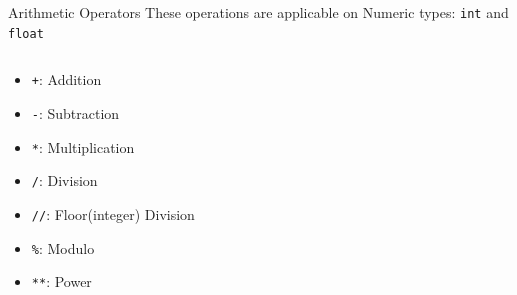         \begin{frame}{Arithmetic Operators}
            \LARGE
            These operations are applicable on Numeric types: \texttt{int} and \texttt{float}
            \pause
            \begin{columns}
               \begin{column}{0.35\textwidth}
                \vspace{-5mm}
                \begin{itemize}
                    \item \texttt{+}: Addition
                    \pause
                    \item \texttt{-}: Subtraction
                    \pause
                    \item \texttt{*}: Multiplication
                    \pause
                    \item \texttt{/}: Division
                    \pause
                    \item \texttt{//}: Floor(integer) Division
                    \pause
                    \item \texttt{\%}: Modulo
                    \pause
                    \item \texttt{**}: Power 
                \end{itemize}
               \end{column}
               \pause
               \begin{column}{0.65\textwidth}
                \inputminted[frame=single,framesep=2pt]{python3}{code-examples/numeric_operators.py}
               \end{column} 
            \end{columns}
        \end{frame}

